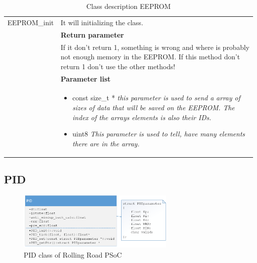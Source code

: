 \begin{table}[H]
\begin{tabular}{|p{5 cm}|p{10 cm}|}
		EEPROM\_init
		& It will initializing the class.
		\\ & \textbf{Return parameter}
		\\ & If it don't return 1, something is wrong and where is probably not enough memory in the EEPROM. If this method don't return 1 don't use the other methods!   
		\\ & \textbf{Parameter list}
		\\ & \begin{itemize}
			\item {\large const size\_t *}
			\subitem \textit{this parameter is used to send a array of sizes of data that will be saved on the EEPROM. The index of the arrays elements is also their IDs.}
			\item {\large uint8}
			\subitem \textit{This parameter is used to tell, have many elements there are in the array.}
		\end{itemize}
		\\ \hline

	\end{tabular}
	\caption{Class description EEPROM}
	\label{table:Class_description_EEPROM_RR_PSoC}
\end{table}

\subsection{PID}

\begin{figure}[H]
	\centering
	\includegraphics [width=3in]{Software/Pictures/klassediagram_PID.png}
	\caption{PID class of Rolling Road PSoC}
	\label{fig:Class_diagram_PID_RR_PSoC}
\end{figure}


